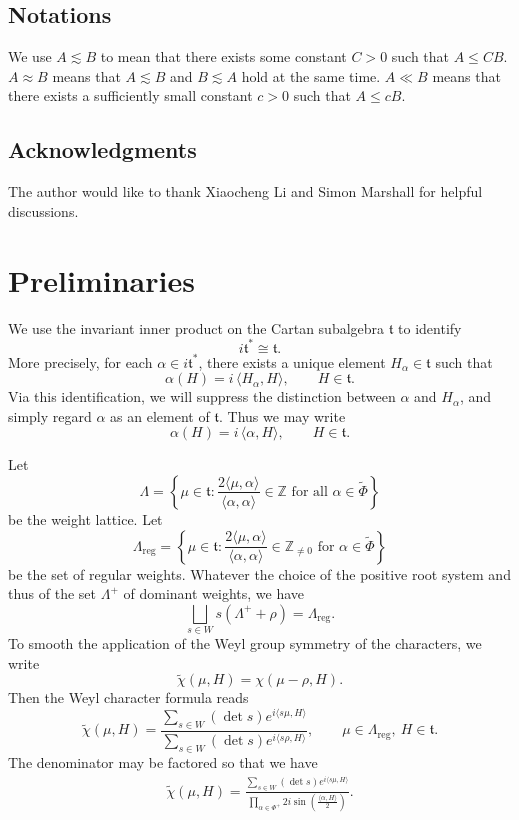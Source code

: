 \documentclass{amsart}
\numberwithin{equation}{section}
\numberwithin{equation}{section}
\begin{document}
\subsection*{Notations} We use $A\lesssim B$ to mean that there exists some constant $C>0$ such that $A\leq CB$. $A\approx B$ means that $A\lesssim B$ and $B\lesssim A$ hold at the same time. $A\ll B$ means that there exists a sufficiently small constant $c>0$ such that $A\leq cB$. 

\subsection*{Acknowledgments} The author would like to thank Xiaocheng Li and Simon Marshall for helpful discussions.

\section{Preliminaries}\label{sec: pre}
We use the invariant inner product on the Cartan subalgebra $\mathfrak{t}$ to identify
\[
i\mathfrak t^* \cong \mathfrak t.
\]
More precisely, for each $\alpha \in i\mathfrak t^*$, there exists a unique element
$H_\alpha \in \mathfrak t$ such that
\[
\alpha(H) = i\,\langle H_\alpha, H\rangle,
\qquad   H \in \mathfrak t.
\]
Via this identification, we will suppress the distinction between
$\alpha$ and $H_\alpha$, and simply regard $\alpha$ as an element of
$\mathfrak t$. 
Thus we may write
\[
\alpha(H) = i\,\langle \alpha, H\rangle,
\qquad H \in \mathfrak t.
\]


Let 
$$\Lambda=\left\{\mu\in\mathfrak{t}: \frac{2\langle\mu,\alpha\rangle}{\langle\alpha,\alpha\rangle}\in\mathbb{Z}\text{ for all }\alpha\in\widetilde{\Phi}\right\}$$
be the weight lattice. 
Let 
$$\Lambda_{\text{reg}}=\left\{\mu\in\mathfrak{t}: \frac{2\langle\mu,\alpha\rangle}{\langle\alpha,\alpha\rangle}\in\mathbb{Z}_{\neq 0}\text{ for }\alpha\in\widetilde{\Phi}\right\}$$ be the set of regular weights. Whatever the choice of the positive root system and thus of the set $\Lambda^+$ of dominant weights,
we have 
$$\bigsqcup_{s\in W}s(\Lambda^++\rho)=\Lambda_{\text{reg}}.$$
To smooth the application of the Weyl group symmetry of the characters, 
we write
$$\widetilde{\chi}(\mu,H)= \chi(\mu-\rho,H).$$
Then the Weyl character formula reads \cite{Wey39}
    $$\widetilde{\chi}(\mu, H)=\frac{\sum_{s\in W} (\det s) e^{i\langle s\mu,H\rangle} }{\sum_{s\in W} (\det s) e^{i\langle s\rho,H\rangle} }, \qquad\mu\in\Lambda_{\text{reg}}, \ H\in\mathfrak{t}.$$
    The denominator may be factored so that we have 
\begin{align}\label{eq: Weyl}
   \widetilde{\chi}(\mu, H)=\frac{\sum_{s\in W} (\det s) e^{i\langle s\mu,H\rangle} }{
    \prod_{\alpha\in\Phi^+}2i\sin\left(\frac{\langle \alpha,H\rangle}{2}\right)
    }.
\end{align}
\end{document}
